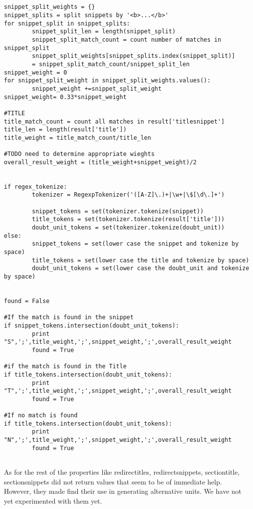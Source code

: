 \documentclass[12pt]{article}
\begin{document}
\begin{lstlisting}[label=pseudo-code,caption=Feature extraction initial steps]


snippet_split_weights = {}
snippet_splits = split snippets by '<b>...</b>' 
for snippet_split in snippet_splits:
        snippet_split_len = length(snippet_split)
        snippet_split_match_count = count number of matches in snippet_split
        snippet_split_weights[snippet_splits.index(snippet_split)] 
		= snippet_split_match_count/snippet_split_len
snippet_weight = 0
for snippet_split_weight in snippet_split_weights.values():
        snippet_weight +=snippet_split_weight
snippet_weight= 0.33*snippet_weight

#TITLE
title_match_count = count all matches in result['titlesnippet']
title_len = length(result['title'])
title_weight = title_match_count/title_len

#TODO need to determine appropriate wieghts
overall_result_weight = (title_weight+snippet_weight)/2


if regex_tokenize:
        tokenizer = RegexpTokenizer('([A-Z]\.)+|\w+|\$[\d\.]+')

        snippet_tokens = set(tokenizer.tokenize(snippet))
        title_tokens = set(tokenizer.tokenize(result['title']))
        doubt_unit_tokens = set(tokenizer.tokenize(doubt_unit))
else:
        snippet_tokens = set(lower case the snippet and tokenize by space)
        title_tokens = set(lower case the title and tokenize by space)
        doubt_unit_tokens = set(lower case the doubt_unit and tokenize by space)


found = False

#If the match is found in the snippet
if snippet_tokens.intersection(doubt_unit_tokens):
        print "S",';',title_weight,';',snippet_weight,';',overall_result_weight
        found = True

#if the match is found in the Title
if title_tokens.intersection(doubt_unit_tokens):
        print "T",';',title_weight,';',snippet_weight,';',overall_result_weight
        found = True

#If no match is found
if title_tokens.intersection(doubt_unit_tokens):
        print "N",';',title_weight,';',snippet_weight,';',overall_result_weight
        found = True


\end{lstlisting}


As for the rest of the properties like redirectitles, redirectsnippets, sectiontitle, sectionsnippets did not return values that seem to be of immediate help. However, they made find their use in generating alternative units. We have not yet experimented with them yet.
\end{document}
